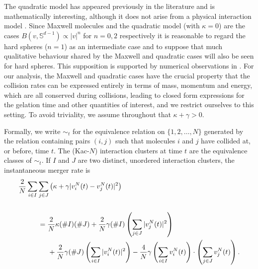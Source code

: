 \documentclass[11pt, notitlepage]{article}
\newcommand{\norm}[1]{|{#1}|}
\begin{document}
The quadratic model has appeared previously in the literature \cite{Lu,PSW17} and is mathematically interesting, although it does not arise from a physical interaction model \cite{Villani}.
Since Maxwell molecules and the quadratic model (with $\kappa = 0$) are the cases  $B(v, \mathbb{S}^{d-1}) \propto |v|^n$ for $n=0,2$ respectively it is reasonable to regard the hard spheres ($n=1$) as an intermediate case and to suppose that much qualitative behaviour shared by the Maxwell and quadratic cases will also be seen for hard spheres.
This supposition is supported by numerical observations in \cite{PSW17}.
For our analysis, the Maxwell and quadratic cases have the crucial property that the collision rates can be expressed entirely in terms of mass, momentum and energy, which are all conserved during collisions, leading to closed form expressions for the gelation time and other quantities of interest, and we restrict ourselves to this setting.
To avoid triviality, we assume throughout that $\kappa + \gamma > 0$.


Formally, we write $\sim_t$ for the equivalence relation on $\{1,2,\dots, N\}$ generated by the relation containing pairs $(i, j)$ such that molecules $i$ and $j$ have collided at, or before, time $t$. The (Kac-$N$) interaction clusters at time $t$ are the equivalence classes of $\sim_t$.
If $I$ and $J$ are two distinct, unordered interaction clusters, the instantaneous merger rate is
\begin{equation}\begin{split}\label{e:cluster-merge-rate}
  &  \frac{2}{N}\sum_{i\in I}\sum_{j\in J}
     \left(\kappa + \gamma \norm{v_i^N(t) - v_j^N(t)}^2 \right)\\
  \\& \hspace{1cm}   =
    \frac{2}{N}\kappa (\#I)(\#J)
    +\frac{2}{N}\gamma (\#{I})\left( \sum_{j\in J}\norm{v_j^N(t)}^2\right)
    \\ & \hspace{1.5cm} +\frac{2}{N}\gamma (\#{J})\left( \sum_{i\in I}\norm{v_i^N(t)}^2\right)
    -\frac{4}{N}\gamma \left(\sum_{i\in I}v_i^N(t)\right)\cdot
    \left(\sum_{j\in J}v_j^N(t)\right).\end{split}\end{equation}
\end{document}
